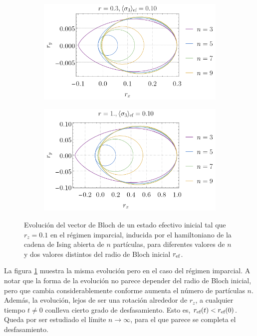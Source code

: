 \begin{figure}
    \centering
    \begin{subfigure}[b]{0.475\textwidth}
        \centering
        \includegraphics[width=\textwidth]{chapter4/figures_special/Ising_Boltz_r=0.3_z=0.10.png}
    \end{subfigure}
    \hfill
    \begin{subfigure}[b]{0.475\textwidth}  
        \centering 
        \includegraphics[width=\textwidth]{chapter4/figures_special/Ising_Boltz_r=1._z=0.10.png}
    \end{subfigure}
    \caption{Evolución del vector de Bloch de un estado efectivo inicial tal que $r_{z}=0.1$ en el régimen imparcial, inducida por el hamiltoniano de la cadena de Ising abierta de $n$ partículas, para diferentes valores de $n$ y dos valores distintos del radio de Bloch inicial $r_{\text{ef}}$.}
    \label{fig:OpenIsingBoltz}
\end{figure}

La figura \ref{fig:OpenIsingBoltz} muestra la misma evolución pero en el caso del régimen imparcial. A notar que la forma de la evolución no parece depender del radio de Bloch inicial, pero que cambia considerablemente conforme aumenta el número de partículas $n$. Además, la evolución, lejos de ser una rotación alrededor de $r_{z}$, a cualquier tiempo $t\neq 0$ conlleva cierto grado de desfasamiento. Esto es, $r_{\text{ef}}(t)<r_{\text{ef}}(0)$. Queda por ser estudiado el límite $n\rightarrow\infty$, para el que parece se completa el desfasamiento.

